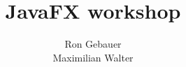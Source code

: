\title{JavaFX workshop}
\author[Ron Gebauer \& Maximlian Walter]{Ron Gebauer \\Maximilian Walter}

\begin{frame}
	\titlepage
\end{frame}